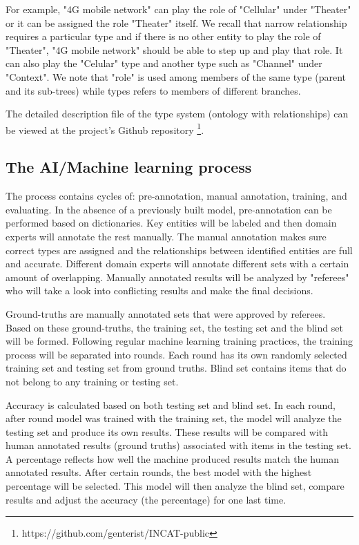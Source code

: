 \documentclass[conference]{IEEEtran}
\begin{document}
For example, "4G mobile network" can play the role of "Cellular" under "Theater" or it can be assigned the role "Theater" itself. We recall that narrow relationship requires a particular type and if there is no other entity to play the role of "Theater", "4G mobile network" should be able to step up and play that role. It can also play the "Celular" type and another type such as "Channel" under "Context". We note that "role" is used among members of the same type (parent and its sub-trees) while types refers to members of different branches.

The detailed description file of the type system (ontology with relationships) can be viewed at the project's Github repository \footnote{https://github.com/genterist/INCAT-public}.

\subsection{The AI/Machine learning process}
The process contains cycles of: pre-annotation, manual annotation, training, and evaluating. In the absence of a previously built model, pre-annotation can be performed based on dictionaries. Key entities will be labeled and then domain experts will annotate the rest manually. The manual annotation makes sure correct types are assigned and the relationships between identified entities are full and accurate. Different domain experts will annotate different sets with a certain amount of overlapping. Manually annotated results will be analyzed by "referees" who will take a look into conflicting results and make the final decisions.

Ground-truths are manually annotated sets that were approved by referees. Based on these ground-truths, the training set, the testing set and the blind set will be formed. Following regular machine learning training practices, the training process will be separated into rounds. Each round has its own randomly selected training set and testing set from ground truths. Blind set contains items that do not belong to any training or testing set.

Accuracy is calculated based on both testing set and blind set. In each round, after round model was trained with the training set, the model will analyze the testing set and produce its own results. These results will be compared with human annotated results (ground truths) associated with items in the testing set. A percentage reflects how well the machine produced results match the human annotated results. After certain rounds, the best model with the highest percentage will be selected. This model will then analyze the blind set, compare results and adjust the accuracy (the percentage) for one last time.
\end{document}
